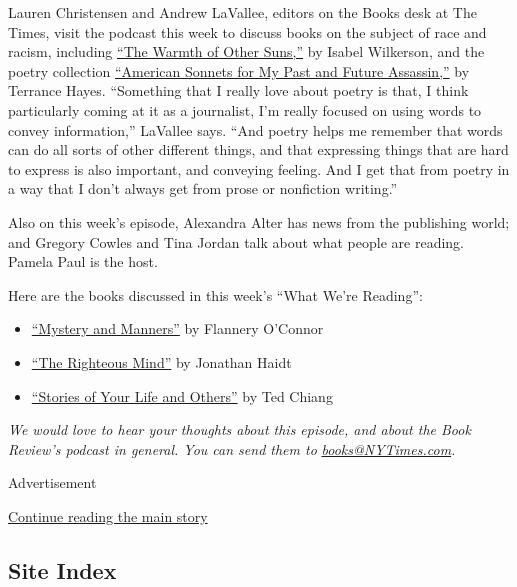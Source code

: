Lauren Christensen and Andrew LaVallee, editors on the Books desk at The
Times, visit the podcast this week to discuss books on the subject of
race and racism, including
\href{https://www.nytimes3xbfgragh.onion/2010/09/05/books/review/Oshinsky-t.html}{``The
Warmth of Other Suns,''} by Isabel Wilkerson, and the poetry collection
\href{https://www.nytimes3xbfgragh.onion/2018/06/19/books/review-terrance-hayes-american-sonnets-for-my-past-and-future-assassin.html}{``American
Sonnets for My Past and Future Assassin,''} by Terrance Hayes.
``Something that I really love about poetry is that, I think
particularly coming at it as a journalist, I'm really focused on using
words to convey information,'' LaVallee says. ``And poetry helps me
remember that words can do all sorts of other different things, and that
expressing things that are hard to express is also important, and
conveying feeling. And I get that from poetry in a way that I don't
always get from prose or nonfiction writing.''

Also on this week's episode, Alexandra Alter has news from the
publishing world; and Gregory Cowles and Tina Jordan talk about what
people are reading. Pamela Paul is the host.

Here are the books discussed in this week's ``What We're Reading'':

\begin{itemize}
\item
  \href{https://www.nytimes3xbfgragh.onion/1969/05/25/archives/mystery-and-manners-by-flannery-oconnor-selected-and-edited-by.html}{``Mystery
  and Manners''} by Flannery O'Connor
\item
  \href{https://www.nytimes3xbfgragh.onion/2012/03/25/books/review/the-righteous-mind-by-jonathan-haidt.html}{``The
  Righteous Mind''} by Jonathan Haidt
\item
  \href{https://www.penguinrandomhouse.com/books/538163/arrival-stories-of-your-life-mti-by-ted-chiang/}{``Stories
  of Your Life and Others''} by Ted Chiang
\end{itemize}

\emph{We would love to hear your thoughts about this episode, and about
the Book Review's podcast in general. You can send them to}
\href{mailto:books@NYTimes.com}{\emph{books@NYTimes.com}}\emph{.}

Advertisement

\protect\hyperlink{after-bottom}{Continue reading the main story}

\hypertarget{site-index}{%
\subsection{Site Index}\label{site-index}}

